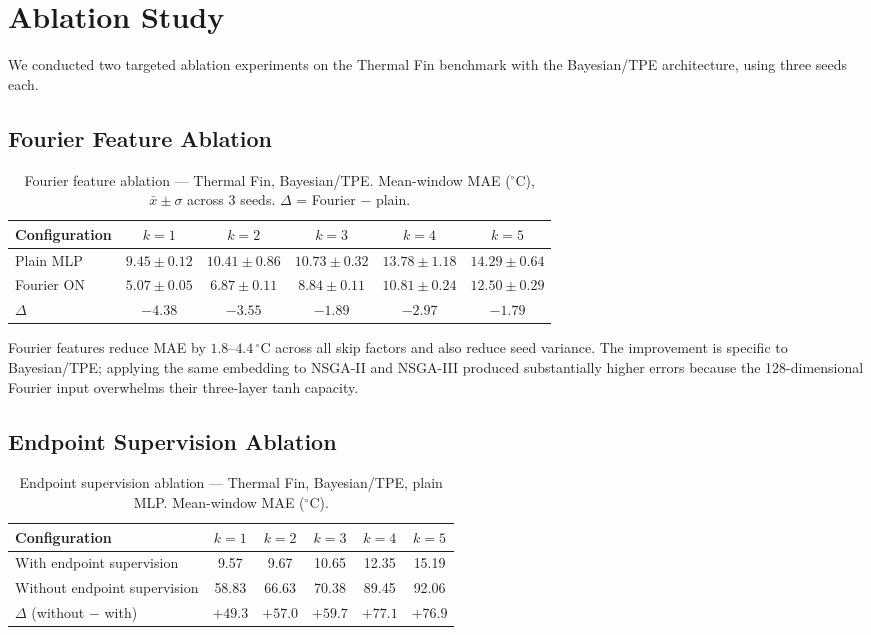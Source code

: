 \chapter{Ablation Study}
\label{app:ablation}

We conducted two targeted ablation experiments on the Thermal Fin benchmark
with the Bayesian/TPE architecture, using three seeds each.

\section{Fourier Feature Ablation}
\label{sec:app_fourier}

\begin{table}[H]
\centering
\caption{Fourier feature ablation --- Thermal Fin, Bayesian/TPE.
Mean-window MAE ($^\circ\mathrm{C}$), $\bar{x}\pm\sigma$ across 3 seeds.
$\Delta$ = Fourier $-$ plain.}
\label{tab:fourier_ablation}
\small
\begin{tabular}{lccccc}
\toprule
Configuration & $k{=}1$ & $k{=}2$ & $k{=}3$ & $k{=}4$ & $k{=}5$ \\
\midrule
Plain MLP  & $9.45\pm0.12$ & $10.41\pm0.86$ & $10.73\pm0.32$ & $13.78\pm1.18$ & $14.29\pm0.64$ \\
Fourier ON & $5.07\pm0.05$ & $6.87\pm0.11$  & $8.84\pm0.11$  & $10.81\pm0.24$ & $12.50\pm0.29$ \\
\midrule
$\Delta$   & $-4.38$ & $-3.55$ & $-1.89$ & $-2.97$ & $-1.79$ \\
\bottomrule
\end{tabular}
\end{table}

Fourier features reduce MAE by $1.8$--$4.4\,^\circ\mathrm{C}$ across all skip
factors and also reduce seed variance.
The improvement is specific to Bayesian/TPE; applying the same embedding to
NSGA-II and NSGA-III produced substantially higher errors because the
128-dimensional Fourier input overwhelms their three-layer tanh capacity.

\section{Endpoint Supervision Ablation}
\label{sec:app_endpoint}

\begin{table}[H]
\centering
\caption{Endpoint supervision ablation --- Thermal Fin, Bayesian/TPE, plain MLP.
Mean-window MAE ($^\circ\mathrm{C}$).}
\label{tab:endpoint_ablation}
\small
\begin{tabular}{lccccc}
\toprule
Configuration & $k{=}1$ & $k{=}2$ & $k{=}3$ & $k{=}4$ & $k{=}5$ \\
\midrule
With endpoint supervision    &  9.57 &  9.67 & 10.65 & 12.35 & 15.19 \\
Without endpoint supervision & 58.83 & 66.63 & 70.38 & 89.45 & 92.06 \\
\midrule
$\Delta$ (without $-$ with)  & $+49.3$ & $+57.0$ & $+59.7$ & $+77.1$ & $+76.9$ \\
\bottomrule
\end{tabular}
\end{table}

